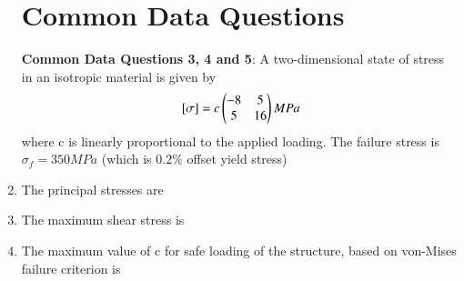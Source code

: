 \documentclass[journal,12pt,onecolumn]{IEEEtran}
\theoremstyle{remark}
\begin{document}
\begin{enumerate}
\section{Common Data Questions}
\textbf{Common Data Questions 3, 4 and 5}: A two-dimensional state of stress in an isotropic material is given by 
\begin{align}
   {}\left[\sigma\right] = c \begin{pmatrix}-8 & 5 \\ 5 & 16\end{pmatrix} MPa
\end{align} 
where c is linearly proportional to the applied loading. The failure stress is $\sigma_{f}=350MPa$ (which is $0.2\%$ offset yield stress)
\item The principal stresses are 
\begin{enumerate}
\end{enumerate}

\item  The maximum shear stress is 
\begin{enumerate}
\end{enumerate}

\item The maximum value of c for safe loading of the structure, based on von-Mises failure criterion is 
\begin{enumerate}
\end{enumerate}


\end{enumerate}
\end{document}
